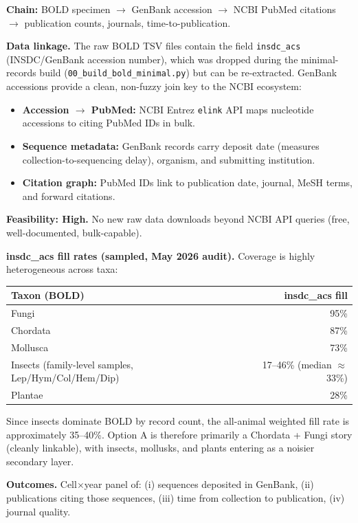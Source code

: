 \documentclass[10pt]{article}
\begin{document}
\textbf{Chain:} BOLD specimen $\to$ GenBank accession $\to$ NCBI PubMed citations $\to$ publication counts, journals, time-to-publication.

\textbf{Data linkage.} The raw BOLD TSV files contain the field \texttt{insdc\_acs} (INSDC/GenBank accession number), which was dropped during the minimal-records build (\texttt{00\_build\_bold\_minimal.py}) but can be re-extracted. GenBank accessions provide a clean, non-fuzzy join key to the NCBI ecosystem:
\begin{itemize}
    \item \textbf{Accession $\to$ PubMed:} NCBI Entrez \texttt{elink} API maps nucleotide accessions to citing PubMed IDs in bulk.
    \item \textbf{Sequence metadata:} GenBank records carry deposit date (measures collection-to-sequencing delay), organism, and submitting institution.
    \item \textbf{Citation graph:} PubMed IDs link to publication date, journal, MeSH terms, and forward citations.
\end{itemize}

\textbf{Feasibility: High.} No new raw data downloads beyond NCBI API queries (free, well-documented, bulk-capable).

\textbf{insdc\_acs fill rates (sampled, May 2026 audit).} Coverage is highly heterogeneous across taxa:

\begin{center}
\small
\begin{tabular}{lr}
\toprule
\textbf{Taxon (BOLD)} & \textbf{insdc\_acs fill} \\
\midrule
Fungi & 95\% \\
Chordata & 87\% \\
Mollusca & 73\% \\
Insects (family-level samples, Lep/Hym/Col/Hem/Dip)\hspace{1em} & 17--46\% (median $\approx$ 33\%) \\
Plantae & 28\% \\
\bottomrule
\end{tabular}
\end{center}

Since insects dominate BOLD by record count, the all-animal weighted fill rate is approximately 35--40\%. Option A is therefore primarily a Chordata + Fungi story (cleanly linkable), with insects, mollusks, and plants entering as a noisier secondary layer.

\textbf{Outcomes.} Cell$\times$year panel of: (i) sequences deposited in GenBank, (ii) publications citing those sequences, (iii) time from collection to publication, (iv) journal quality.
\end{document}
